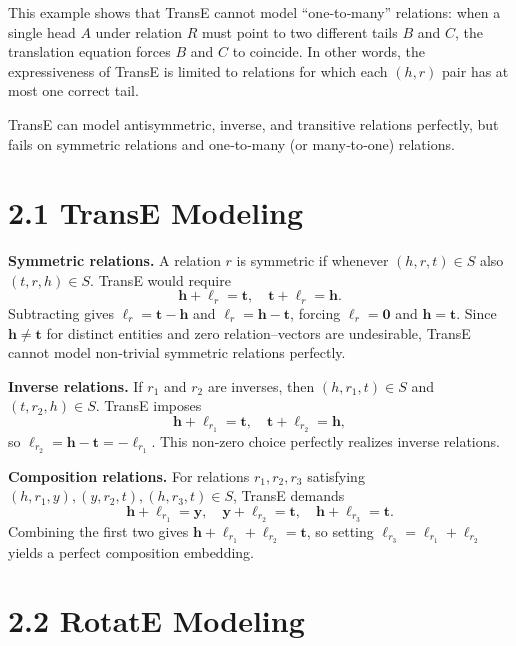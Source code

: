 \documentclass[a4paper,12pt]{article}
\begin{document}
This example shows that TransE cannot model “one‑to‑many” relations: when a single head \(A\) under relation \(R\) must point to two different tails \(B\) and \(C\), the translation equation forces \(B\) and \(C\) to coincide.  In other words, the expressiveness of TransE is limited to relations for which each \((h,r)\) pair has at most one correct tail.  

TransE can model antisymmetric, inverse, and transitive relations perfectly, but fails on symmetric relations and one‑to‑many (or many‑to‑one) relations. 


\section*{2.1 TransE Modeling}

\noindent\textbf{Symmetric relations.} A relation \(r\) is symmetric if whenever \((h,r,t)\in S\) also \((t,r,h)\in S\).  TransE would require
\[
\mathbf{h} + \boldsymbol{\ell}_r = \mathbf{t},
\quad
\mathbf{t} + \boldsymbol{\ell}_r = \mathbf{h}.
\]
Subtracting gives \(\boldsymbol{\ell}_r = \mathbf{t}-\mathbf{h}\) and \(\boldsymbol{\ell}_r = \mathbf{h}-\mathbf{t}\), forcing \(\boldsymbol{\ell}_r=\mathbf{0}\) and \(\mathbf{h}=\mathbf{t}\).  Since \(\mathbf{h}\neq\mathbf{t}\) for distinct entities and zero relation–vectors are undesirable, TransE cannot model non‐trivial symmetric relations perfectly.

\medskip
\noindent\textbf{Inverse relations.} If \(r_1\) and \(r_2\) are inverses, then \((h,r_1,t)\in S\) and \((t,r_2,h)\in S\).  TransE imposes
\[
\mathbf{h} + \boldsymbol{\ell}_{r_1} = \mathbf{t},
\quad
\mathbf{t} + \boldsymbol{\ell}_{r_2} = \mathbf{h},
\]
so \(\boldsymbol{\ell}_{r_2} = \mathbf{h}-\mathbf{t} = -\boldsymbol{\ell}_{r_1}\).  This non‐zero choice perfectly realizes inverse relations.

\medskip
\noindent\textbf{Composition relations.} For relations \(r_1,r_2,r_3\) satisfying 
\((h,r_1,y),(y,r_2,t),(h,r_3,t)\in S\), TransE demands
\[
\mathbf{h} + \boldsymbol{\ell}_{r_1} = \mathbf{y},
\quad
\mathbf{y} + \boldsymbol{\ell}_{r_2} = \mathbf{t},
\quad
\mathbf{h} + \boldsymbol{\ell}_{r_3} = \mathbf{t}.
\]
Combining the first two gives \(\mathbf{h}+\boldsymbol{\ell}_{r_1}+\boldsymbol{\ell}_{r_2}=\mathbf{t}\), so setting \(\boldsymbol{\ell}_{r_3}=\boldsymbol{\ell}_{r_1}+\boldsymbol{\ell}_{r_2}\) yields a perfect composition embedding.


\section*{2.2 RotatE Modeling}
\end{document}
